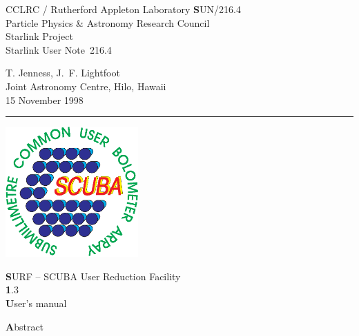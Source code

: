 \documentclass[twoside,11pt]{article}
\newcommand{\stardoccategory}  {Starlink User Note}
\newcommand{\stardocinitials}  {SUN}
\newcommand{\stardocnumber}    {216.4}
\newcommand{\stardocauthors}   {T. Jenness, J.~F. Lightfoot\\
                                Joint Astronomy Centre, Hilo, Hawaii}
\newcommand{\stardocdate}      {15 November 1998}
\newcommand{\stardoctitle}     {SURF -- SCUBA User Reduction Facility}
\newcommand{\stardocversion}   {1.3}
\newcommand{\stardocmanual}    {User's manual}
\newcommand{\stardocname}{\stardocinitials /\stardocnumber}
\newenvironment{latexonly}{}{}
\renewcommand{\_}{\texttt{\symbol{95}}}
\begin{document}
\thispagestyle{empty}



\begin{latexonly}
   CCLRC / {\textsc Rutherford Appleton Laboratory} \hfill {\textbf \stardocname}\\
   {\large Particle Physics \& Astronomy Research Council}\\
   {\large Starlink Project\\}
   {\large \stardoccategory\ \stardocnumber}
   \begin{flushright}
   \stardocauthors\\
   \stardocdate
   \end{flushright}
   \vspace{-4mm}
   \rule{\textwidth}{0.5mm}
   \vspace{5mm}
   \begin{center}
   \includegraphics[width=2.0in]{sun216_logo.eps}

   {\Huge\textbf  \stardoctitle \\ [2.5ex]}
   {\LARGE\textbf \stardocversion \\ [4ex]}
   {\Huge\textbf  \stardocmanual}
   \end{center}
   \vspace{5mm}


   \vspace{10mm}
   \begin{center}
      {\Large\textbf Abstract}
   \end{center}
\end{latexonly}
\end{document}
